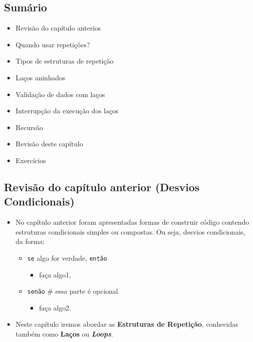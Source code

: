 \documentclass[12pt,a4paper]{article}
\providecommand{\tightlist}{%
      \setlength{\itemsep}{0pt}\setlength{\parskip}{0pt}}
\begin{document}
    \hypertarget{sumuxe1rio}{%
\subsection{Sumário}\label{sumuxe1rio}}

\begin{itemize}
\tightlist
\item
  Revisão do capítulo anterios
\item
  Quando usar repetições?
\item
  Tipos de estruturas de repetição
\item
  Laços aninhados
\item
  Validação de dados com laços
\item
  Interrupção da execução dos laços
\item
  Recursão
\item
  Revisão deste capítulo
\item
  Exercícios
\end{itemize}

    \hypertarget{revisuxe3o-do-capuxedtulo-anterior-desvios-condicionais}{%
\subsection{Revisão do capítulo anterior (Desvios
Condicionais)}\label{revisuxe3o-do-capuxedtulo-anterior-desvios-condicionais}}

    \begin{itemize}
\item
  No capítulo anterior foram apresentadas formas de construir código
  contendo estruturas condicionais simples ou compostas. Ou seja,
  desvios condicionais, da forma:

  \begin{itemize}
  \tightlist
  \item
    \texttt{se} algo for verdade, \texttt{então}

    \begin{itemize}
    \tightlist
    \item
      faça algo1,
    \end{itemize}
  \item
    \texttt{senão} \# essa parte é opcional

    \begin{itemize}
    \tightlist
    \item
      faça algo2.
    \end{itemize}
  \end{itemize}
\item
  Neste capítulo iremos abordar as \textbf{Estruturas de Repetição},
  conhecidas também como \textbf{Laços} ou \textbf{\emph{Loops}}.
\end{itemize}
\end{document}
